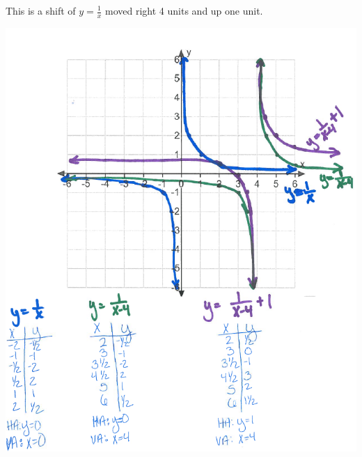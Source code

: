 \documentclass[nooutcomes, noinstructornotes]{ximera}
\begin{document}
\begin{problem}
\begin{enumerate}
	\begin{freeResponse}
		This is a shift of $y=\frac{1}{x}$ moved right 4 units and up one unit.
		\begin{image}		
	\includegraphics[scale=0.8]{Figure7.png}
	\end{image}
	\end{freeResponse}
\end{enumerate}

\end{problem}
\end{document}
